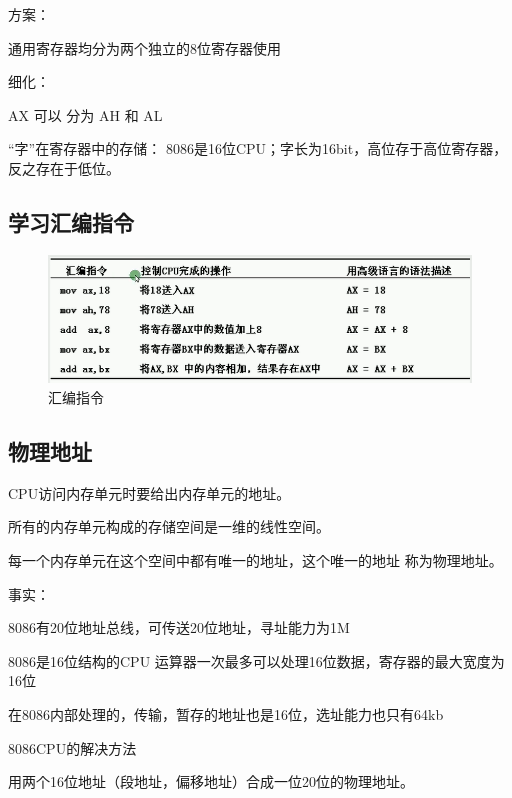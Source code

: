 \documentclass[12pt]{ctexart}
\begin{document}
方案：

通用寄存器均分为两个独立的8位寄存器使用

细化：

AX 可以 分为 AH 和 AL

“字”在寄存器中的存储：
8086是16位CPU；字长为16bit，高位存于高位寄存器，反之存在于低位。

\subsection{学习汇编指令}
\begin{figure}[htbp]
    \centering
    \includegraphics[scale=0.6]{汇编指令.png}
    \caption{汇编指令}
    \end{figure} 
\subsection{物理地址}
CPU访问内存单元时要给出内存单元的地址。

所有的内存单元构成的存储空间是一维的线性空间。

每一个内存单元在这个空间中都有唯一的地址，这个唯一的地址
称为物理地址。

事实：

8086有20位地址总线，可传送20位地址，寻址能力为1M

8086是16位结构的CPU
运算器一次最多可以处理16位数据，寄存器的最大宽度为16位

在8086内部处理的，传输，暂存的地址也是16位，选址能力也只有64kb

8086CPU的解决方法

用两个16位地址（段地址，偏移地址）合成一位20位的物理地址。
\end{document}
